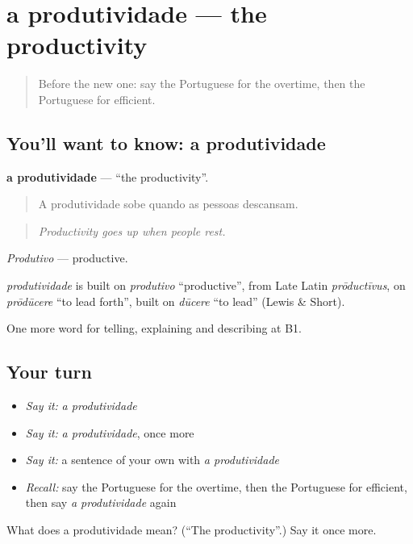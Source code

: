 \section[a produtividade]{a produtividade — the productivity}

\label{lesson:PT-C361-produtividade}



\begin{quote}
Before the new one: say the Portuguese for the overtime, then the Portuguese for efficient.
\end{quote}

\subsection*{You'll want to know: a produtividade}
\textbf{a produtividade} — \textquotedblleft{}the productivity\textquotedblright{}.

\begin{quote}
A produtividade sobe quando as pessoas descansam.
\end{quote}

\begin{quote}
\emph{Productivity goes up when people rest.}
\end{quote}

\emph{Produtivo} — productive.

\begin{cousinweb}
\emph{produtividade} is built on \emph{produtivo} \textquotedblleft{}productive\textquotedblright{}, from Late Latin \emph{prōductīvus}, on \emph{prōdūcere} \textquotedblleft{}to lead forth\textquotedblright{}, built on \emph{dūcere} \textquotedblleft{}to lead\textquotedblright{} (Lewis \& Short).
\end{cousinweb}

\begin{grammarlens}[title={What you've built}]
One more word for telling, explaining and describing at B1.
\end{grammarlens}

\subsection*{Your turn}
\begin{itemize}
\raggedright
  \item \emph{Say it:} \emph{a produtividade}
  \item \emph{Say it:} \emph{a produtividade}, once more
  \item \emph{Say it:} a sentence of your own with \emph{a produtividade}
  \item \emph{Recall:} say the Portuguese for the overtime, then the Portuguese for efficient, then say \emph{a produtividade} again
\end{itemize}

\begin{tcolorbox}[breakable,colback=teal!4,colframe=teal!35!black,title={Before you move on}]
What does a produtividade mean? (\textquotedblleft{}The productivity\textquotedblright{}.) Say it once more.
\end{tcolorbox}
